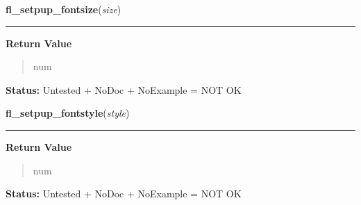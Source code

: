     \vspace{0.5ex}

\hspace{.8\funcindent}\begin{boxedminipage}{\funcwidth}

    \raggedright \textbf{fl\_setpup\_fontsize}(\textit{size})

    \vspace{-1.5ex}

    \rule{\textwidth}{0.5\fboxrule}
\setlength{\parskip}{2ex}
\setlength{\parskip}{1ex}
      \textbf{Return Value}
    \vspace{-1ex}

      \begin{quote}
      num

      \end{quote}

\textbf{Status:} Untested + NoDoc + NoExample = NOT OK



    \end{boxedminipage}

    \label{xformslib:library:fl_setpup_default_fontstyle}

    \vspace{0.5ex}

\hspace{.8\funcindent}\begin{boxedminipage}{\funcwidth}

    \raggedright \textbf{fl\_setpup\_fontstyle}(\textit{style})

    \vspace{-1.5ex}

    \rule{\textwidth}{0.5\fboxrule}
\setlength{\parskip}{2ex}
\setlength{\parskip}{1ex}
      \textbf{Return Value}
    \vspace{-1ex}

      \begin{quote}
      num

      \end{quote}

\textbf{Status:} Untested + NoDoc + NoExample = NOT OK



    \end{boxedminipage}

    \label{xformslib:library:fl_setpup_default_color}

